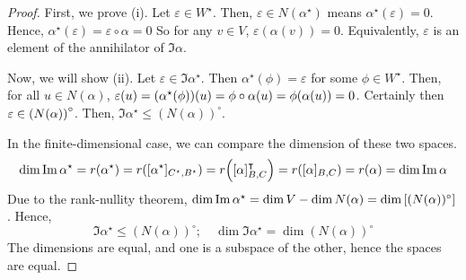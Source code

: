 \begin{proof}
	First, we prove (i).
	Let \( \varepsilon \in W^\star \).
	Then, \( \varepsilon \in N(\alpha^\star) \) means \( \alpha^\star(\varepsilon) = 0 \).
	Hence, \( \alpha^\star(\varepsilon) = \varepsilon \circ \alpha = 0 \)
	So for any \( v \in V \), \( \varepsilon(\alpha(v)) = 0 \).
	Equivalently, \( \varepsilon \) is an element of the annihilator of \( \Im \alpha \).

	Now, we will show (ii).
	Let \( \varepsilon \in \Im \alpha^\star \).
	Then \( \alpha^\star(\phi) = \varepsilon \) for some \( \phi \in W^\star \).
	Then, for all \( u \in N(\alpha) \), \( \varepsilon(u) = \qty(\alpha^\star(\phi))(u) = \phi \circ \alpha(u) = \phi(\alpha(u)) = 0 \).
	Certainly then \( \varepsilon \in \qty(N(\alpha))^\circ \).
	Then, \( \Im \alpha^\star \leq (N(\alpha))^\circ \).

	In the finite-dimensional case, we can compare the dimension of these two spaces.
	\[
		\dim \Im \alpha^\star = r(\alpha^\star) = r\qty([\alpha^\star]_{C^\star, B^\star}) = r\qty([\alpha]_{B,C}^\intercal) = r\qty([\alpha]_{B,C}) = r(\alpha) = \dim \Im \alpha
	\]
	Due to the rank-nullity theorem, \( \dim \Im \alpha^\star = \dim V - \dim N(\alpha) = \dim\qty[(N(\alpha))^\circ] \).
	Hence,
	\[
		\Im \alpha^\star \leq (N(\alpha))^\circ;\quad \dim \Im \alpha^\star = \dim (N(\alpha))^\circ
	\]
	The dimensions are equal, and one is a subspace of the other, hence the spaces are equal.
\end{proof}

